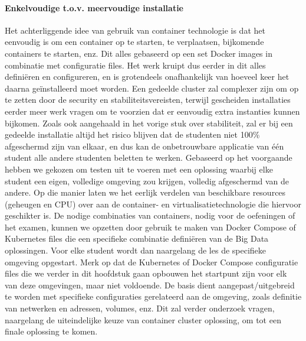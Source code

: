 \paragraph{Enkelvoudige t.o.v. meervoudige installatie}
Het achterliggende idee van gebruik van container technologie is dat het eenvoudig is om een container op te starten, te verplaatsen, bijkomende containers te starten, enz. Dit alles gebaseerd op een set Docker images in combinatie met configuratie files.
\newline
Het werk kruipt dus eerder in dit alles definiëren en configureren, en is grotendeels onafhankelijk van hoeveel keer het daarna geïnstalleerd moet worden. Een gedeelde cluster zal complexer zijn om op te zetten door de security en stabiliteitsvereisten, terwijl gescheiden installaties eerder meer werk vragen om te voorzien dat er eenvoudig extra instanties kunnen bijkomen.
\newline
Zoals ook aangehaald in het vorige stuk over stabiliteit, zal er bij een gedeelde installatie altijd het risico blijven dat de studenten niet 100\% afgeschermd zijn van elkaar, en dus kan de onbetrouwbare applicatie van \'e\'en student alle andere studenten beletten te werken.
\newline
\newline
\newline
Gebaseerd op het voorgaande hebben we gekozen om testen uit te voeren met een oplossing waarbij elke student een eigen, volledige omgeving zou krijgen, volledig afgeschermd van de andere. Op die manier laten we het eerlijk verdelen van beschikbare resources (geheugen en CPU) over aan de container- en virtualisatietechnologie die hiervoor geschikter is.
\newline
De nodige combinaties van containers, nodig voor de oefeningen of het examen, kunnen we opzetten door gebruik te maken van Docker Compose of Kubernetes files die een specifieke combinatie definiëren van de Big Data oplossingen. Voor elke student wordt dan naargelang de les de specifieke omgeving opgestart.
\newline
Merk op dat de Kubernetes of Docker Compose configuratie files die we verder in dit hoofdstuk gaan opbouwen het startpunt zijn voor elk van deze omgevingen, maar niet voldoende. De basis dient aangepast/uitgebreid te worden met specifieke configuraties gerelateerd aan de omgeving, zoals definitie van netwerken en adressen, volumes, enz. Dit zal verder onderzoek vragen, naargelang de uiteindelijke keuze van container cluster oplossing, om tot een finale oplossing te komen.
